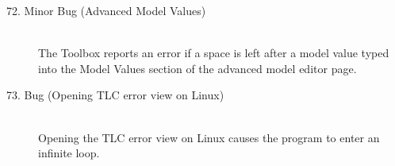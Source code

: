 \documentclass{article}
\begin{document}
\begin{description}
\item[72. Minor Bug (Advanced Model Values)] \mbox{}\\
The Toolbox reports an error if a space is left after a model
value typed into the Model Values section of the advanced
model editor page.

\item[73. Bug (Opening TLC error view on Linux)] \mbox{}\\
%
Opening the TLC error view on Linux causes the program to enter an
infinite loop.  

\end{description}
\end{document}
